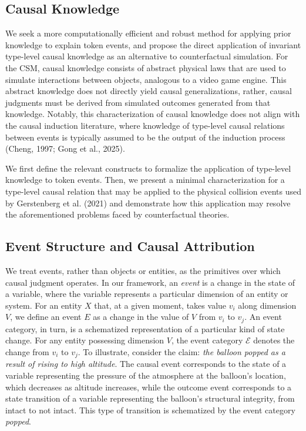 \documentclass[10pt,letterpaper]{article}
\begin{document}
\subsection{Causal Knowledge}
We seek a more computationally efficient and robust method for applying prior knowledge to explain token events, and propose the direct application of invariant type-level causal knowledge as an alternative to counterfactual simulation. For the CSM, causal knowledge consists of abstract physical laws that are used to simulate interactions between objects, analogous to a video game engine. This abstract knowledge does not directly yield causal generalizations, rather, causal judgments must be derived from simulated outcomes generated from that knowledge. Notably, this characterization of causal knowledge does not align with the causal induction literature, where knowledge of type-level causal relations between events is typically assumed to be the output of the induction process (Cheng, 1997; Gong et al., 2025).

We first define the relevant constructs to formalize the application of type-level knowledge to token events. Then, we present a minimal characterization for a type-level causal relation that may be applied to the physical collision events used by Gerstenberg et al. (2021) and demonstrate how this application may resolve the aforementioned problems faced by counterfactual theories.

\subsection{Event Structure and Causal Attribution}

We treat events, rather than objects or entities, as the primitives over which causal judgment operates. In our framework, an \textit{event} is a change in the state of a variable, where the variable represents a particular dimension of an entity or system. For an entity $X$ that, at a given moment, takes value $v_i$ along dimension $V$, we define an event $E$ as a change in the value of $V$ from $v_i$ to $v_j$. An event category, in turn, is a schematized representation of a particular kind of state change. For any entity possessing dimension $V$, the event category $\mathcal{E}$ denotes the change from $v_i$ to $v_j$. To illustrate, consider the claim: \textit{the balloon popped as a result of rising to high altitude}. The causal event corresponds to the state of a variable representing the pressure of the atmosphere at the balloon’s location, which decreases as altitude increases, while the outcome event corresponds to a state transition of a variable representing the balloon’s structural integrity, from intact to not intact. This type of transition is schematized by the event category \textit{popped}. 
\end{document}
